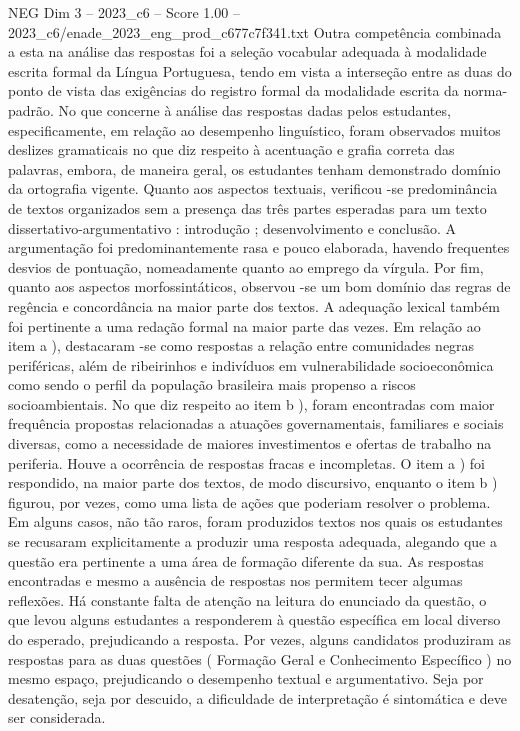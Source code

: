 \begin{textsample}{NEG Dim 3 – 2023\_c6 – Score 1.00 – 2023\_c6/enade\_2023\_eng\_prod\_c677c7f341.txt}
Outra competência combinada a esta na análise das respostas foi a seleção vocabular adequada à modalidade escrita formal da Língua Portuguesa, tendo em vista a interseção entre as duas do ponto de vista das exigências do registro formal da modalidade escrita da norma-padrão.
No que concerne à análise das respostas dadas pelos estudantes, especificamente, em relação ao desempenho linguístico, foram observados muitos deslizes gramaticais no que diz respeito à acentuação e grafia correta das palavras, embora, de maneira geral, os estudantes tenham demonstrado domínio da ortografia vigente.
Quanto aos aspectos textuais, verificou -se predominância de textos organizados sem a presença das três partes esperadas para um texto dissertativo-argumentativo : introdução ; desenvolvimento e conclusão.
A argumentação foi predominantemente rasa e pouco elaborada, havendo frequentes desvios de pontuação, nomeadamente quanto ao emprego da vírgula.
Por fim, quanto aos aspectos morfossintáticos, observou -se um bom domínio das regras de regência e concordância na maior parte dos textos.
A adequação lexical também foi pertinente a uma redação formal na maior parte das vezes.
Em relação ao item a ), destacaram -se como respostas a relação entre comunidades negras periféricas, além de ribeirinhos e indivíduos em vulnerabilidade socioeconômica como sendo o perfil da população brasileira mais propenso a riscos socioambientais.
No que diz respeito ao item b ), foram encontradas com maior frequência propostas relacionadas a atuações governamentais, familiares e sociais diversas, como a necessidade de maiores investimentos e ofertas de trabalho na periferia.
Houve a ocorrência de respostas fracas e incompletas.
O item a ) foi respondido, na maior parte dos textos, de modo discursivo, enquanto o item b ) figurou, por vezes, como uma lista de ações que poderiam resolver o problema.
Em alguns casos, não tão raros, foram produzidos textos nos quais os estudantes se recusaram explicitamente a produzir uma resposta adequada, alegando que a questão era pertinente a uma área de formação diferente da sua.
As respostas encontradas e mesmo a ausência de respostas nos permitem tecer algumas reflexões.
Há constante falta de atenção na leitura do enunciado da questão, o que levou alguns estudantes a responderem à questão específica em local diverso do esperado, prejudicando a resposta.
Por vezes, alguns candidatos produziram as respostas para as duas questões ( Formação Geral e Conhecimento Específico ) no mesmo espaço, prejudicando o desempenho textual e argumentativo.
Seja por desatenção, seja por descuido, a dificuldade de interpretação é sintomática e deve ser considerada.

\end{textsample}
